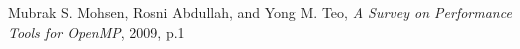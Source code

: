 \documentclass[10pt,journal,compsoc]{IEEEtran}
\begin{document}
\ifCLASSOPTIONcaptionsoff
  \newpage
\fi


\begin{thebibliography}{1}

Mubrak S. Mohsen, Rosni Abdullah, and Yong M. Teo, \emph{A Survey on Performance Tools for OpenMP}, 2009, p.1

\end{thebibliography}

\end{document}
